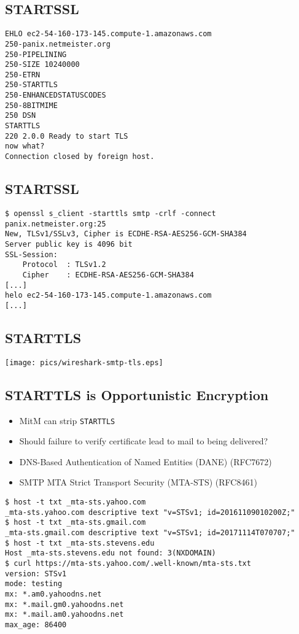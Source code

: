 \documentclass[xga]{xdvislides}
\begin{document}
\subsection{STARTSSL}
\begin{verbatim}
EHLO ec2-54-160-173-145.compute-1.amazonaws.com
250-panix.netmeister.org
250-PIPELINING
250-SIZE 10240000
250-ETRN
250-STARTTLS
250-ENHANCEDSTATUSCODES
250-8BITMIME
250 DSN
STARTTLS
220 2.0.0 Ready to start TLS
now what?
Connection closed by foreign host.
\end{verbatim}

\subsection{STARTSSL}
\begin{verbatim}
$ openssl s_client -starttls smtp -crlf -connect panix.netmeister.org:25
New, TLSv1/SSLv3, Cipher is ECDHE-RSA-AES256-GCM-SHA384
Server public key is 4096 bit
SSL-Session:
    Protocol  : TLSv1.2
    Cipher    : ECDHE-RSA-AES256-GCM-SHA384
[...]
helo ec2-54-160-173-145.compute-1.amazonaws.com
[...]
\end{verbatim}

\subsection{STARTTLS}
\begin{center}
	\texttt{[image: pics/wireshark-smtp-tls.eps]}
\end{center}

\subsection{STARTTLS is Opportunistic Encryption}
\begin{itemize}
	\item MitM can strip \verb+STARTTLS+
	\item Should failure to verify certificate lead to mail to being delivered?
	\item DNS-Based Authentication of Named Entities (DANE) (RFC7672)
	\item SMTP MTA Strict Transport Security (MTA-STS) (RFC8461)
\end{itemize}

\begin{verbatim}
$ host -t txt _mta-sts.yahoo.com
_mta-sts.yahoo.com descriptive text "v=STSv1; id=20161109010200Z;"
$ host -t txt _mta-sts.gmail.com
_mta-sts.gmail.com descriptive text "v=STSv1; id=20171114T070707;"
$ host -t txt _mta-sts.stevens.edu
Host _mta-sts.stevens.edu not found: 3(NXDOMAIN)
$ curl https://mta-sts.yahoo.com/.well-known/mta-sts.txt
version: STSv1
mode: testing
mx: *.am0.yahoodns.net
mx: *.mail.gm0.yahoodns.net
mx: *.mail.am0.yahoodns.net
max_age: 86400
\end{verbatim}
\end{document}
